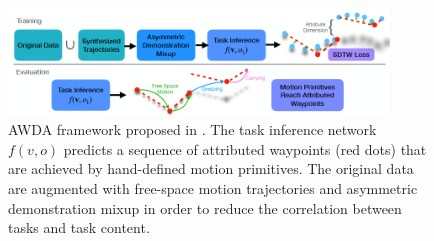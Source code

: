 \begin{figure}[t]
    \centering
    \includegraphics[width=0.9\textwidth]{figures/images/awda/awda_framework.png}
    \caption{AWDA framework proposed in \cite{chang2023one}. The task inference network $f(v,o)$ predicts a sequence of attributed waypoints (red dots) that are achieved by hand-defined motion primitives. The original data are augmented with free-space motion trajectories and asymmetric demonstration mixup in order to reduce the correlation between tasks and task content.}
    \label{fig:awda_framework}
\end{figure}
